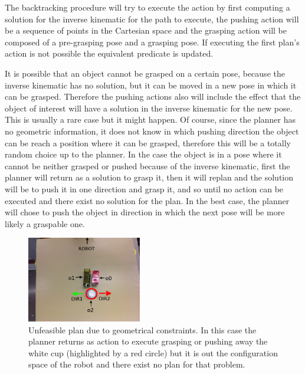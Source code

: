 
  
The backtracking procedure will try to execute the action by first computing a solution for the inverse kinematic for the path to execute, the pushing action will be a sequence of points in the Cartesian space and the grasping action will be composed of a pre-grasping pose and a grasping pose. If executing the first plan's action is not possible the equivalent  predicate is updated. 

It is possible that an object cannot be grasped on a certain pose, because the inverse kinematic has no solution, but it can be moved in a new pose in which it can be grasped. Therefore the pushing actions also will include the effect that the object of interest will have a solution in the inverse kinematic for the new pose. This is usually a rare case but it might happen. Of course, since the planner has no geometric information, it does not know in which pushing direction the object can be reach a position where it can be grasped, therefore this will be a totally random choice up to the planner. In the case the object is in a pose where it cannot be neither grasped or pushed because of the inverse kinematic, first the planner will return as a solution to grasp it, then it will replan and the solution will be to push it in one direction and grasp it, and so until no action can be executed and there exist no solution for the plan. In the best case, the planner will chose to push the object in direction in which the next pose will be more likely a graspable one. 

\begin{figure}[h]
\centering
\includegraphics[width=5cm]{Img/backtracking/image4.png}
\caption{Unfeasible plan due to geometrical constraints. In this case the planner returns as action to execute grasping or pushing away the white cup (highlighted by a red circle) but it is out the configuration space of the robot and there exist no plan for that problem.} \label{fig:backtracking1}
\end{figure}

